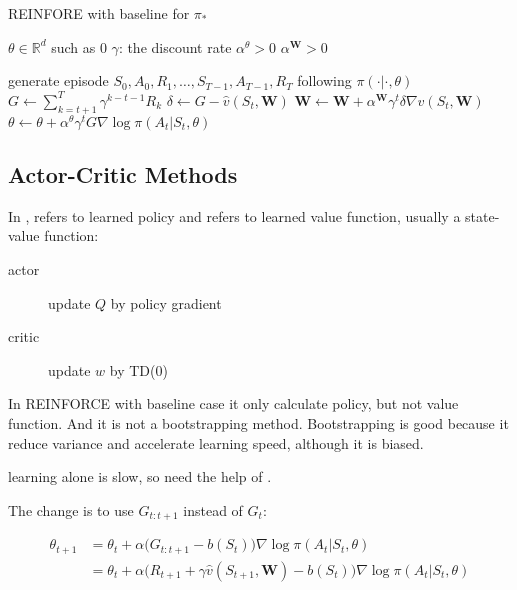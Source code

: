 \begin{algorithm}
	\caption{REINFORE with baseline for $\pi_*$}\label{algo:reinforcemontecarlowithbase}	
	
	\begin{algorithmic}[1]
		\State $ \theta \in \mathbb{R}^d $ such as $0$
		\State $\gamma$: the discount rate
		\State $\alpha^\theta > 0$
		\State $\alpha^{\mathbf{W}} > 0$
		
		\Statex
		
		\Loop
			\State generate episode $S_0,A_0,R_1,\dots,S_{T-1},A_{T-1},R_T$ following $\pi(\cdot|\cdot, \theta)$
				\State $G \gets \sum_{k=t+1}^T \gamma^{k-t-1} R_k$
				\State $\delta \gets G - \widehat{v}(S_t, \mathbf{W})$
				\State $\mathbf{W} \gets \mathbf{W} + \alpha^{\mathbf{W}} \gamma^t \delta \nabla \widehat{v}(S_t, \mathbf{W}) $ 
				\State $\theta \gets \theta + \alpha^\theta \gamma^t G \nabla \log \pi(A_t|S_t,\theta) $
			\EndFor
		\EndLoop		
	\end{algorithmic}
\end{algorithm}

\subsection{Actor-Critic Methods}

In ,  refers to learned policy and  refers to learned value function, usually a state-value function:
\begin{description}
	\item [actor] update $Q$ by policy gradient
	\item [critic] update $w$ by TD(0)
\end{description}

In REINFORCE with baseline case it only calculate policy, but not value function. And it is not a bootstrapping method. Bootstrapping is good because it reduce variance and accelerate learning speed, although it is biased. 

 learning alone is slow, so need the help of .

The change is to use $G_{t:t+1}$ instead of $G_t$:

\begin{equation}
	\begin{aligned}
		\theta_{t+1} &= \theta_t + \alpha \Big( G_{t:t+1} - b(S_t) \Big) \nabla \log \pi(A_t|S_t,\mathbb{\theta}) \\
		&= \theta_t + \alpha \Big( R_{t+1} + \gamma \widehat{v}(S_{t+1},\mathbf{W}) - b(S_t) \Big) \nabla \log \pi(A_t|S_t,\mathbb{\theta})
	\end{aligned}
\end{equation}

